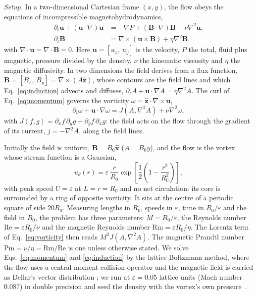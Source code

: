 \documentclass[aps,prl,twocolumn,reprint,amsmath,amssymb,superscriptaddress,floatfix]{revtex4-2}
\newcommand{\Rm}{\mathrm{Rm}}
\newcommand{\Rey}{\mathrm{Re}}
\newcommand{\eps}{\varepsilon}
\begin{document}
\indent \textit{Setup.} In a two-dimensional Cartesian frame $(x,y)$, the flow obeys the
equations of incompressible magnetohydrodynamics,
\begin{align}
\partial_t\bm u+(\bm u\cdot\nabla)\bm u&=-\nabla P+(\bm B\cdot\nabla)\bm B
+\nu\nabla^2\bm u,\label{eq:momentum}\\
\partial_t\bm B&=\nabla\times(\bm u\times\bm B)+\eta\nabla^2\bm B,\label{eq:induction}
\end{align}
with $\nabla\cdot\bm u=\nabla\cdot\bm B=0$. Here $\bm u=[u_x, \, u_y]$ is the velocity, $P$ the
total, fluid plus magnetic, pressure divided by the density, $\nu$ the kinematic
viscosity and $\eta$ the magnetic diffusivity. In two dimensions the field derives
from a flux function, $\bm B = [B_x, \, B_y] =\nabla\times(A\hat{\bm z})$, whose contours are the
field lines and which Eq.~\eqref{eq:induction} advects and diffuses,
$\partial_tA+\bm u\cdot\nabla A=\eta\nabla^2A$. The curl of
Eq.~\eqref{eq:momentum} governs the vorticity $\omega=\hat{\bm z}\cdot\nabla\times\bm u$,
\begin{equation}
\partial_t\omega+\bm u\cdot\nabla\omega=J(A,\nabla^2A)+\nu\nabla^2\omega,
\label{eq:vorticity}
\end{equation}
with $J(f,g)=\partial_xf\,\partial_yg-\partial_yf\,\partial_xg$: the field acts on
the flow through the gradient of its current, $j=-\nabla^2A$, along the field
lines.

Initially the field is uniform, $\bm B=B_0\hat{\bm x}$ ($A=B_0y$), and the flow is
the vortex whose stream function is a Gaussian,
\begin{equation}
u_\theta(r)=\eps\,\frac{r}{R_0}\exp\!\left[\frac{1}{2}\left(1-\frac{r^2}{R_0^2}\right)\right],
\label{eq:vortex}
\end{equation}
with peak speed $U=\eps$ at $L=r=R_0$ and no net circulation: its core is surrounded by
a ring of opposite vorticity. It sits at the centre of a periodic square of side
$20R_0$. Measuring lengths in $R_0$, speeds in $\eps$, time in $R_0/\eps$ and the
field in $B_0$, the problem has three parameters: $M=B_0/\eps$, the Reynolds number
$\Rey=\eps R_0/\nu$ and the magnetic Reynolds number $\Rm=\eps R_0/\eta$. The
Lorentz term of Eq.~\eqref{eq:vorticity} then reads $M^2J(A,\nabla^2A)$. The
magnetic Prandtl number $\mathrm{Pm}=\nu/\eta=\Rm/\Rey$ is one unless otherwise
stated. We solve Eqs.~\eqref{eq:momentum} and \eqref{eq:induction} by the lattice
Boltzmann method, where the flow uses a central-moment collision operator \cite{derosis2018, PhysRevE.95.013310} and the
magnetic field is carried as Dellar's vector distribution \cite{dellar2002}; we run at
$\eps=0.05$ lattice units (Mach number $0.087$) in double precision and seed the
density with the vortex's own pressure~\cite{PhysRevE.101.043306}.
\end{document}
